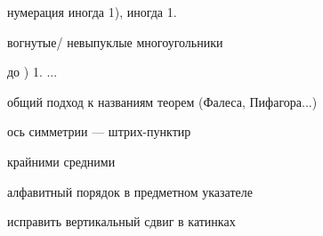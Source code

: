 

















нумерация иногда 1), иногда 1.




вогнутые/ невыпуклые многоугольники 

\smallskip до ) 1. ...

общий подход к названиям теорем (Фалеса, Пифагора...)

ось симметрии --- штрих-пунктир




крайними средними




алфавитный порядок в предметном указателе

исправить вертикальный сдвиг в катинках